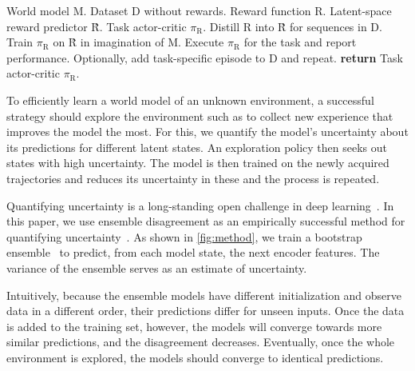 \documentclass{article}
\begin{document}
\begin{algorithm}[t]
\caption{Zero and Few-Shot Task Adaptation}
\label{alg:adaptation}
\begin{algorithmic}[1]
\STATE {} World model M.
\STATE \makebox[4.5em][l]{} Dataset D without rewards.
\STATE \makebox[4.5em][l]{} Reward function R.
\STATE {} Latent-space reward predictor \^{R}.
\STATE \makebox[4.5em][l]{} Task actor-critic $\pi_\mathrm{R}$.
\STATE Distill R into \^{R} for sequences in D.
\STATE Train $\pi_\mathrm{R}$ on \^{R} in imagination of M.
\STATE Execute $\pi_\mathrm{R}$ for the task and report performance.
\STATE Optionally, add task-specific episode to D and repeat.
\ENDWHILE
\STATE \textbf{return} Task actor-critic $\pi_\mathrm{R}$.
\vspace{.3ex}
\end{algorithmic}
\end{algorithm}

To efficiently learn a world model of an unknown environment, a successful strategy should explore the environment such as to collect new experience that improves the model the most. For this, we quantify the model's uncertainty about its predictions for different latent states. An exploration policy then seeks out states with high uncertainty. The model is then trained on the newly acquired trajectories and reduces its uncertainty in these and the process is repeated.

Quantifying uncertainty is a long-standing open challenge in deep learning~\cite{mackay1992infogain,gal2016uncertainty}. In this paper, we use ensemble disagreement as an empirically successful method for quantifying uncertainty~\cite{lakshminarayanan2017simple,osband2018randomized}. As shown in \cref{fig:method}, we train a bootstrap ensemble~\cite{breiman1996bagging} to predict, from each model state, the next encoder features. The variance of the ensemble serves as an estimate of uncertainty.

Intuitively, because the ensemble models have different initialization and observe data in a different order, their predictions differ for unseen inputs. Once the data is added to the training set, however, the models will converge towards more similar predictions, and the disagreement decreases. Eventually, once the whole environment is explored, the models should converge to identical predictions.
\end{document}
